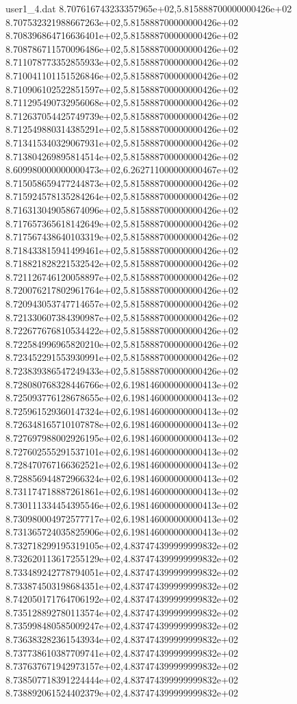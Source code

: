 \begin{filecontents}{user1_4.dat}
8.707616743233357965e+02,5.815888700000000426e+02
8.707532321988667263e+02,5.815888700000000426e+02
8.708396864716636401e+02,5.815888700000000426e+02
8.708786711570096486e+02,5.815888700000000426e+02
8.711078773352855933e+02,5.815888700000000426e+02
8.710041101151526846e+02,5.815888700000000426e+02
8.710906102522851597e+02,5.815888700000000426e+02
8.711295490732956068e+02,5.815888700000000426e+02
8.712637054425749739e+02,5.815888700000000426e+02
8.712549880314385291e+02,5.815888700000000426e+02
8.713415340329067931e+02,5.815888700000000426e+02
8.713804269895814514e+02,5.815888700000000426e+02
8.609980000000000473e+02,6.262711000000000467e+02
8.715058659477244873e+02,5.815888700000000426e+02
8.715924578135284264e+02,5.815888700000000426e+02
8.716313049058674096e+02,5.815888700000000426e+02
8.717657365618142649e+02,5.815888700000000426e+02
8.717567438640103319e+02,5.815888700000000426e+02
8.718433815941499461e+02,5.815888700000000426e+02
8.718821828221532542e+02,5.815888700000000426e+02
8.721126746120058897e+02,5.815888700000000426e+02
8.720076217802961764e+02,5.815888700000000426e+02
8.720943053747714657e+02,5.815888700000000426e+02
8.721330607384390987e+02,5.815888700000000426e+02
8.722677676810534422e+02,5.815888700000000426e+02
8.722584996965820210e+02,5.815888700000000426e+02
8.723452291553930991e+02,5.815888700000000426e+02
8.723839386547249433e+02,5.815888700000000426e+02
8.728080768328446766e+02,6.198146000000000413e+02
8.725093776128678655e+02,6.198146000000000413e+02
8.725961529360147324e+02,6.198146000000000413e+02
8.726348165710107878e+02,6.198146000000000413e+02
8.727697988002926195e+02,6.198146000000000413e+02
8.727602555291537101e+02,6.198146000000000413e+02
8.728470767166362521e+02,6.198146000000000413e+02
8.728856944872966324e+02,6.198146000000000413e+02
8.731174718887261861e+02,6.198146000000000413e+02
8.730111334454395546e+02,6.198146000000000413e+02
8.730980004972577717e+02,6.198146000000000413e+02
8.731365724035825906e+02,6.198146000000000413e+02
8.732718299195319105e+02,4.837474399999999832e+02
8.732620113617255129e+02,4.837474399999999832e+02
8.733489242778794051e+02,4.837474399999999832e+02
8.733874503198684351e+02,4.837474399999999832e+02
8.742050171764706192e+02,4.837474399999999832e+02
8.735128892780113574e+02,4.837474399999999832e+02
8.735998480585009247e+02,4.837474399999999832e+02
8.736383282361543934e+02,4.837474399999999832e+02
8.737738610387709741e+02,4.837474399999999832e+02
8.737637671942973157e+02,4.837474399999999832e+02
8.738507718391224444e+02,4.837474399999999832e+02
8.738892061524402379e+02,4.837474399999999832e+02

\end{filecontents}
